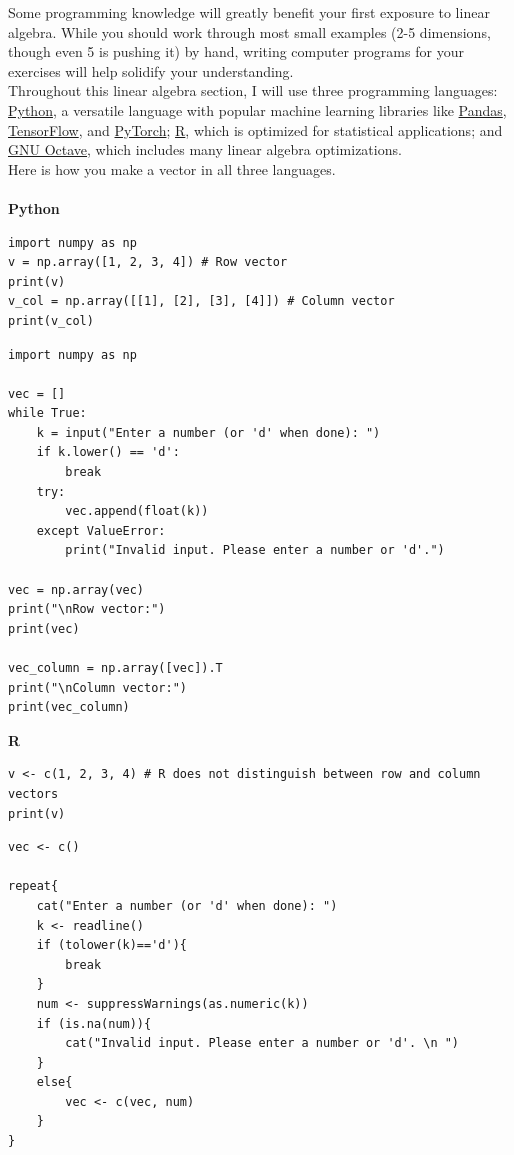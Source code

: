 \begin{codingexample}
  Some programming knowledge will greatly benefit your first exposure to linear algebra. While you should work through most small examples (2-5 dimensions, though even 5 is pushing it) by hand, writing computer programs for your exercises will help solidify your understanding. \\
Throughout this linear algebra section, I will use three programming languages: \href{https://www.python.org}{Python}, a versatile language with popular machine learning libraries like \href{https://pandas.pydata.org}{Pandas}, \href{https://www.tensorflow.org}{TensorFlow}, and \href{https://pytorch.org}{PyTorch}; \href{https://www.r-project.org}{R}, which is optimized for statistical applications; and \href{https://octave.org}{GNU Octave}, which includes many linear algebra optimizations. \\ 
Here is how you make a vector in all three languages. \\ \\
\textbf{Python} 
\begin{lstlisting}[style=catppuccin-python]
import numpy as np
v = np.array([1, 2, 3, 4]) # Row vector
print(v)
v_col = np.array([[1], [2], [3], [4]]) # Column vector 
print(v_col)
\end{lstlisting}
\newpage


\begin{lstlisting}[style=catppuccin-python]
import numpy as np

vec = []
while True:
    k = input("Enter a number (or 'd' when done): ")
    if k.lower() == 'd':
        break
    try:
        vec.append(float(k))
    except ValueError:
        print("Invalid input. Please enter a number or 'd'.")

vec = np.array(vec)
print("\nRow vector:")
print(vec)

vec_column = np.array([vec]).T
print("\nColumn vector:")
print(vec_column)
\end{lstlisting}


 {\color[HTML]{a6e3a1}\textbf{R}}
\begin{lstlisting}[style=catppuccin-r]
v <- c(1, 2, 3, 4) # R does not distinguish between row and column vectors
print(v)
\end{lstlisting}


\begin{lstlisting}[style=catppuccin-r]
vec <- c()

repeat{
    cat("Enter a number (or 'd' when done): ")
    k <- readline()
    if (tolower(k)=='d'){
        break
    }
    num <- suppressWarnings(as.numeric(k))
    if (is.na(num)){
        cat("Invalid input. Please enter a number or 'd'. \n ")
    }
    else{
        vec <- c(vec, num)
    }
}


\end{lstlisting}
\end{codingexample}
